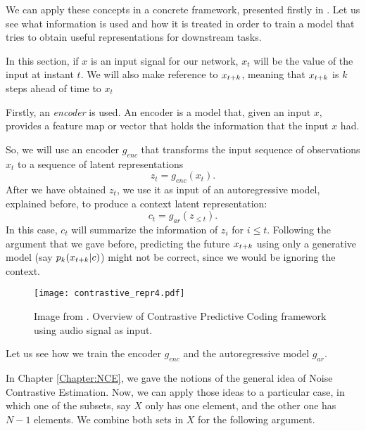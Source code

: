 We can apply these concepts in a concrete framework, presented firstly in \cite{oord_representation_2019}. Let us see what information is used and how it is treated in order to train a model that tries to obtain useful representations for downstream tasks.

In this section, if $x$ is an input signal for our network, $x_t$ will be the value of the input at instant $t$. We will also make reference to $x_{t+k}$, meaning that $x_{t+k}$ is $k$ steps ahead of time to $x_t$

Firstly, an \emph{encoder} is used. An encoder is a model that, given an input $x$, provides a feature map or vector that holds the information that the input $x$ had.

So, we will use an encoder $g_{enc}$ that transforms the input sequence of observations $x_t$ to a sequence of latent representations
$$
z_t = g_{enc}(x_t).
$$
After we have obtained $z_t$, we use it as input of an autoregressive model, explained before, to produce a context latent representation:
$$
c_t = g_{ar}(z_{\leq t}).
$$
In this case, $c_t$ will summarize the information of $z_i$ for $i \leq t$. Following the argument that we gave before, predicting the future $x_{t+k}$ using only a generative model (say $p_k(x_{t+k}|c)$)
might not be correct, since we would be ignoring the context. \\

\begin{figure}[H]
    \centering 
    \texttt{[image: contrastive\_repr4.pdf]}
    \caption{Image from \citep{oord_representation_2019}. Overview of Contrastive Predictive Coding framework using audio signal as input. }
\end{figure}

Let us see how we train the encoder $g_{enc}$ and the autoregressive model $g_{ar}$.

In Chapter \ref{Chapter:NCE}, we gave the notions of the general idea of Noise Contrastive Estimation. Now, we can apply those ideas to a particular case, in which one of the subsets, say $X$ only has one element, and the other one has $N-1$ elements. We combine both sets in $X$ for the following argument.

